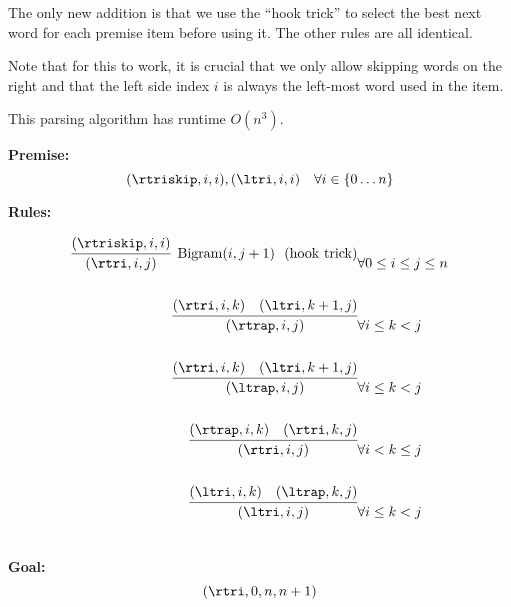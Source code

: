 \documentclass{article}
\begin{document}
The only new addition is that we use the ``hook trick'' to select the best next word for each premise item before using it. The other rules are all identical.

Note that for this to work, it is crucial that we only allow skipping words on the right and that the left side index $i$ is always the left-most word used in the item.

This parsing algorithm has runtime $O(n^3)$.


\noindent \textbf{Premise:}
\[(\rtriskip, i,i), (\ltri, i,i)\ \ \  \forall i \in \{0 \ldots n\}\]

\noindent \textbf{Rules:}


\begin{eqnarray*}
\infer[\mathrm{Bigram}(i,j+1) \ \ \mathrm{(hook\ trick)}]{(\rtri, i,j)}{(\rtriskip, i, i)} &  \forall 0 \leq i \leq j \leq n\\\\
\infer{(\rtrap, i,j)}{(\rtri, i,k)  &  (\ltri, k+1, j) } &  \forall  i\leq k < j  \\\\
\infer{(\ltrap, i,j)}{(\rtri, i,k)  &  (\ltri, k+1, j) } & \forall i\leq k < j\\\\
\infer{(\rtri, i,j)}{(\rtrap, i,k)  &  (\rtri, k, j) }    &  \forall i<  k \leq j \\\\
\infer{(\ltri, i,j)}{(\ltri, i,k)  &  (\ltrap, k, j) }  & \forall i\leq k < j \\\\
\end{eqnarray*}

\noindent \textbf{Goal:}\[ (\rtri, 0,n, n + 1)\]




\end{document}
